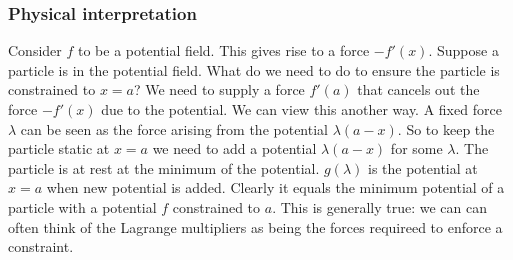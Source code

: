 \documentclass[12pt,reqno]{article}      %
\theoremstyle{definition}
\begin{document}
\subsubsection{Physical interpretation}
Consider $f$ to be a potential field.
This gives rise to a force $-f'(x)$.
Suppose a particle is in the potential field.
What do we need to do to ensure the particle is constrained to $x=a$?
We need to supply a force $f'(a)$ that cancels out the force $-f'(x)$ due to the potential.
We can view this another way.
A fixed force $\lambda$ can be seen as the force arising from the potential $\lambda(a-x)$.
So to keep the particle static at $x=a$ we need to add a potential $\lambda(a-x)$ for some $\lambda$.
The particle is at rest at the minimum of the potential.
$g(λ)$ is the potential at $x=a$ when new potential is added.
Clearly it equals the minimum potential of a particle with a potential $f$ constrained to $a$.
This is generally true: we can can often think of the Lagrange multipliers as being the forces requireed to enforce a constraint.
\end{document}
